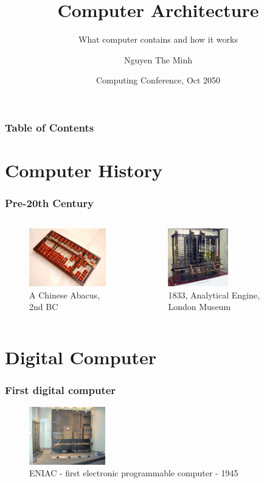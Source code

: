 \documentclass{beamer}
\title{Computer Architecture}
\subtitle{What computer contains and how it works}
\author{Nguyen The Minh}
\institute{Electronics and Computer Science Institute}
\date{Computing Conference, Oct 2050}
\begin{document}
\frame{\titlepage}

\begin{frame}
\frametitle{Table of Contents}
\tableofcontents
\end{frame}

\section{Computer History}
\begin{frame}
\frametitle{Pre-20th Century}
\begin{columns}

\begin{figure}[h!]
  \includegraphics[height=2.5cm]{img/abacus.jpeg}
    \caption{A Chinese Abacus, 2nd BC}
\end{figure}
\begin{figure}[h!]
  \includegraphics[height=2.5cm]{img/AnalyticalMachine.jpg}
    \caption{1833, Analytical Engine, London Museum}
\end{figure}
\end{columns}
\end{frame}

\section{Digital Computer}

\begin{frame}
\frametitle{First digital computer}
\begin{figure}[h!]
  \includegraphics[height=2.5cm]{img/ENIAC.jpg}
    \caption{ENIAC - first electronic programmable computer - 1945}
\end{figure}
\end{frame}
\end{document}
